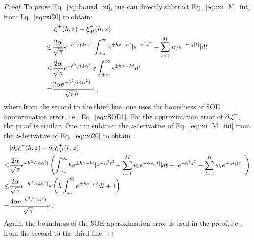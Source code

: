 \begin{proof}
	To prove Eq.~\eqref{eq::bound_xi}, one can directly subtract Eq.~\eqref{eq::xi_M_int} from  Eq.~\eqref{eq::xi20} to obtain:
	\begin{equation}
		\begin{split}
			&\lvert\xi^{\pm}(h, z) - \xi_{M}^{\pm}(h, z)\rvert\\
			\leq & \frac{2 \alpha}{\sqrt{\pi}} e^{-h^2/(4 \alpha^2)} \int_{\pm z}^\infty e^{\pm hz - h t} \lvert e^{-\alpha^2 t^2} - \sum_{l = 1}^M w_l e^{-\alpha s_l\lvert t\rvert} \rvert dt \\
			\leq & \frac{2 \alpha}{\sqrt{\pi}} e^{ - h^2/(4 \alpha^2)} \varepsilon \int_{\pm z}^\infty e^{\pm hz - h t} dt \\
			= & \frac{2 \alpha e^{-h^2/(4 \alpha^2)}}{\sqrt{\pi} h} \varepsilon\;,
		\end{split}
	\end{equation}
	where from the second to the third line, one uses the boundness of SOE approximation error, i.e., Eq.~\eqref{eq::SOE1}.
	For the approximation error of $\partial_z\xi^{\pm}$, the proof is similar. One can subtract the $z$-derivative of Eq.~\eqref{eq::xi_M_int} from the $z$-derivative of Eq.~\eqref{eq::xi20} to obtain
	\begin{equation}
	\begin{split}
	& \lvert\partial_z \xi^{\pm}(h, z) - \partial_z \xi_{M}^{\pm}(h, z)\rvert\\
	\leq & \frac{2 \alpha}{\sqrt{\pi}} e^{-h^2/(4 \alpha^2)} \left( \int_{\pm z}^\infty h e^{\pm hz - h t} \lvert e^{-\alpha^2 t^2} - \sum_{l = 1}^M w_l e^{-\alpha s_l\lvert t\rvert} \rvert dt + \lvert e^{-\alpha^2 z^2} - \sum_{l = 1}^M w_l e^{-\alpha s_l\lvert z\rvert} \rvert \right)\\
	\leq & \frac{2 \alpha}{\sqrt{\pi}} e^{ - h^2/(4 \alpha^2)} \varepsilon \left( h \int_{\pm z}^\infty e^{\pm hz - h t} dt + 1 \right) \\
	= & \frac{4 \alpha e^{-h^2/(4 \alpha^2)}}{\sqrt{\pi}} \varepsilon\;.
	\end{split}
	\end{equation}
	Again, the boundness of the SOE approximation error is used in the proof, i.e., from the second to the third line.
\end{proof}


